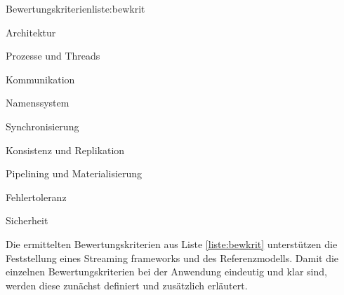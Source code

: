 \begin{itemlist}{Bewertungskriterien}{liste:bewkrit}
	\item Architektur
	\item Prozesse und Threads
	\item Kommunikation
	\item Namenssystem
	\item Synchronisierung
	\item Konsistenz und Replikation
	\item Pipelining und Materialisierung
	\item Fehlertoleranz
	\item Sicherheit	
\end{itemlist}

Die ermittelten Bewertungskriterien aus Liste \ref{liste:bewkrit} unterstützen die Feststellung eines Streaming frameworks und des Referenzmodells. Damit die einzelnen Bewertungskriterien bei der Anwendung eindeutig und klar sind, werden diese zunächst definiert und zusätzlich erläutert.

